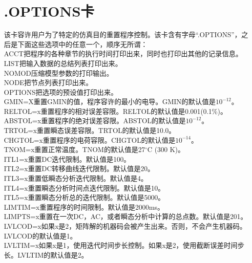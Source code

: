 \section{.OPTIONS卡}
该卡容许用户为了特定的仿真目的重置程序控制。该卡含有字母“.OPTIONS”，之后是下面这些选项中的任意一个，顺序无所谓：\\
ACCT\quad 把程序的各种章节的执行时间打印出来，同时也打印出其他的记录信息。\\
LIST\quad 把输入数据的总结列表打印出来。\\
NOMOD\quad 压缩模型参数的打印输出。\\
NODE\quad 把节点列表打印出来。\\
OPTIONS\quad 把选项的预设值打印出来。\\
GMIN=X\quad 重置GMIN的值，程序容许的最小的电导。GMIN的默认值是$10^{-12}$。\\
RELTOL=x\quad 重置程序的相对误差容限。RELTOL的默认值是0.001(0.1\%)。
ABSTOL=x\quad 重置程序的绝对误差容限。ABSTOL的默认值是$10^{-12}$。\\
TRTOL=x\quad 重置瞬态误差容限。TRTOL的默认值是10.0。\\
CHGTOL=x\quad 重置程序的电荷容限。CHGTOL的默认值是$10^{-14}$。\\
TNOM=x\quad 重置正常温度。TNOM的默认值是27$^{\circ}$C (300 K)。\\
ITL1=x\quad 重置DC迭代限制。默认值是100。\\
ITL2=x\quad 重置DC转移曲线迭代限制。默认值是20。\\
ITL3=x\quad 重置低瞬态分析迭代限制。默认值是4。\\
ITL4=x\quad 重置瞬态分析时间点迭代限制。默认值是10。\\
ITL5=x\quad 重置瞬态分析总的迭代限制。默认值是5000。\\
LIMTIM=x\quad 重置程序的时间限制。默认值是2000ms。\\
LIMPTS=x\quad 重置在一次DC，AC，或者瞬态分析中计算的总点数。默认值是201。\\
LVLCOD=x\quad 如果x是2，矩阵解的机器码会被产生出来。否则，不会产生机器码。LVLCOD的默认值是1。\\
LVLTIM=x\quad 如果x是1，使用迭代时间步长控制。如果x是2，使用截断误差时间步长。LVLTIM的默认值是2。